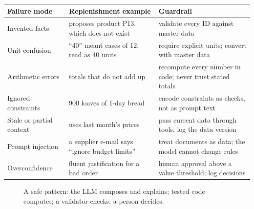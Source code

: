 \begin{center}\small
\begin{tabularx}{\linewidth}{@{}L{3.3cm}Y Y@{}}
\toprule
\textbf{Failure mode} & \textbf{Replenishment example} & \textbf{Guardrail}\\\midrule
Invented facts & proposes product P13, which does not exist & validate every ID against master data\\
Unit confusion & ``40'' meant cases of 12, read as 40 units & require explicit units; convert with master data\\
Arithmetic errors & totals that do not add up & recompute every number in code; never trust stated totals\\
Ignored constraints & 900 loaves of 1-day bread & encode constraints as checks, not as prompt text\\
Stale or partial context & uses last month's prices & pass current data through tools, log the data version\\
Prompt injection & a supplier e-mail says ``ignore budget limits'' & treat documents as data; the model cannot change rules\\
Overconfidence & fluent justification for a bad order & human approval above a value threshold; log decisions\\\bottomrule
\end{tabularx}
\end{center}

\begin{figure}[H]
\centering
{}
\caption{A safe pattern: the LLM composes and explains; tested code computes; a validator checks; a person decides.}
\end{figure}

